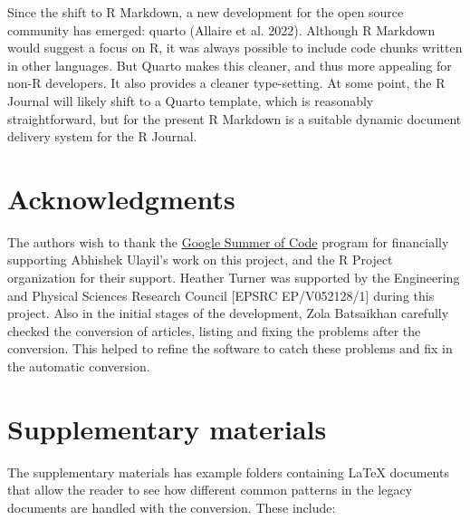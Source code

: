 Since the shift to R Markdown, a new development for the open source community has emerged: quarto (Allaire et al. 2022). Although R Markdown would suggest a focus on R, it was always possible to include code chunks written in other languages. But Quarto makes this cleaner, and thus more appealing for non-R developers. It also provides a cleaner type-setting. At some point, the R Journal will likely shift to a Quarto template, which is reasonably straightforward, but for the present R Markdown is a suitable dynamic document delivery system for the R Journal.

\hypertarget{acknowledgments}{%
\section*{Acknowledgments}\label{acknowledgments}}

The authors wish to thank the \href{https://summerofcode.withgoogle.com}{Google Summer of Code} program for financially supporting Abhishek Ulayil's work on this project, and the R Project organization for their support. Heather Turner was supported by the Engineering and Physical Sciences Research Council {[}EPSRC EP/V052128/1{]} during this project. Also in the initial stages of the development, Zola Batsaikhan carefully checked the conversion of articles, listing and fixing the problems after the conversion. This helped to refine the software to catch these problems and fix in the automatic conversion.

\hypertarget{supplementary-materials}{%
\section*{Supplementary materials}\label{supplementary-materials}}

The supplementary materials has example folders containing LaTeX documents that allow the reader to see how different common patterns in the legacy documents are handled with the conversion. These include:

